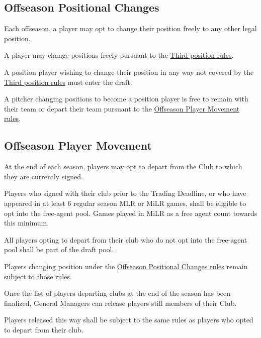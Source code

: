 \subsection{Offseason Positional Changes}
\label{sec:OPC}
\begin{deepEnumerate}
	\item Each offseason, a player may opt to change their position freely to any other legal position.
	\item A player may change positions freely pursuant to the \hyperref[sec:Third position]{Third position rules}.
	\item A position player wishing to change their position in any way not covered by the \hyperref[sec:Third position]{Third position rules} must enter the draft.
	\item A pitcher changing positions to become a position player is free to remain with their team or depart their team pursuant to the
	\hyperref[sec:OPM]{Offseason Player Movement rules}.
\end{deepEnumerate}

\subsection{Offseason Player Movement}
\label{sec:OPM}
\begin{deepEnumerate}
	\item At the end of each season, players may opt to depart from the Club to which they are currently signed.
	\begin{deepEnumerate}
		\item Players who signed with their club prior to the Trading Deadline, or who have appeared in at least 6 regular season MLR or MiLR games, shall be eligible
		to opt into the free-agent pool. Games played in MiLR as a free agent count towards this minimum.
		\item All players opting to depart from their club who do not opt into the free-agent pool shall be part of the draft pool.
		\item Players changing position under the \hyperref[sec:OPC]{Offseason Positional Changes rules} remain subject to those rules.
	\end{deepEnumerate}
	\item Once the list of players departing clubs at the end of the season has been finalized, General Managers can release players still members of their Club.
	\begin{deepEnumerate}
		\item Players released this way shall be subject to the same rules as players who opted to depart from their club.
	\end{deepEnumerate}
\end{deepEnumerate}

